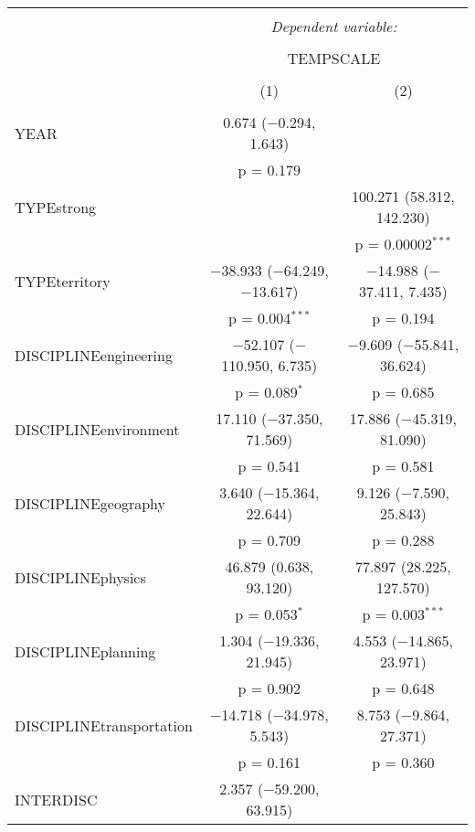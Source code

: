 
\begin{table}[!htbp] \centering 
  \caption{} 
  \label{} 
\begin{tabular}{@{\extracolsep{5pt}}lcc} 
\\[-1.8ex]\hline 
\hline \\[-1.8ex] 
 & \multicolumn{2}{c}{\textit{Dependent variable:}} \\ 
\cline{2-3} 
\\[-1.8ex] & \multicolumn{2}{c}{TEMPSCALE} \\ 
\\[-1.8ex] & (1) & (2)\\ 
\hline \\[-1.8ex] 
 YEAR & 0.674 ($-$0.294, 1.643) &  \\ 
  & p = 0.179 &  \\ 
  TYPEstrong &  & 100.271 (58.312, 142.230) \\ 
  &  & p = 0.00002$^{***}$ \\ 
  TYPEterritory & $-$38.933 ($-$64.249, $-$13.617) & $-$14.988 ($-$37.411, 7.435) \\ 
  & p = 0.004$^{***}$ & p = 0.194 \\ 
  DISCIPLINEengineering & $-$52.107 ($-$110.950, 6.735) & $-$9.609 ($-$55.841, 36.624) \\ 
  & p = 0.089$^{*}$ & p = 0.685 \\ 
  DISCIPLINEenvironment & 17.110 ($-$37.350, 71.569) & 17.886 ($-$45.319, 81.090) \\ 
  & p = 0.541 & p = 0.581 \\ 
  DISCIPLINEgeography & 3.640 ($-$15.364, 22.644) & 9.126 ($-$7.590, 25.843) \\ 
  & p = 0.709 & p = 0.288 \\ 
  DISCIPLINEphysics & 46.879 (0.638, 93.120) & 77.897 (28.225, 127.570) \\ 
  & p = 0.053$^{*}$ & p = 0.003$^{***}$ \\ 
  DISCIPLINEplanning & 1.304 ($-$19.336, 21.945) & 4.553 ($-$14.865, 23.971) \\ 
  & p = 0.902 & p = 0.648 \\ 
  DISCIPLINEtransportation & $-$14.718 ($-$34.978, 5.543) & 8.753 ($-$9.864, 27.371) \\ 
  & p = 0.161 & p = 0.360 \\ 
  INTERDISC & 2.357 ($-$59.200, 63.915) &  \\ 

\end{tabular}
\end{table}
